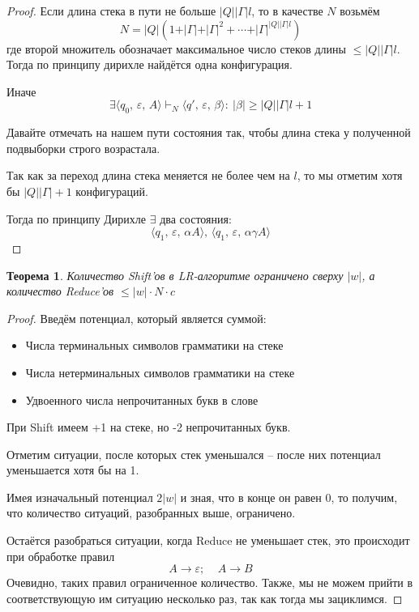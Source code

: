 \documentclass[a4paper,12pt]{article}
\renewcommand{\leq}{\ensuremath{\leqslant}}
\renewcommand{\geq}{\ensuremath{\geqslant}}
\theoremstyle{plain}
\newtheorem{theorem}{Теорема}[subsection]
\theoremstyle{definition}
\theoremstyle{remark}
\begin{document}
\begin{proof}
	Если длина стека в пути не больше $\vert Q\vert\vert\Gamma\vert l$, то в качестве $N$ возьмём
	\[
		N = \vert Q\vert(1 + \vert \Gamma\vert + \vert\Gamma\vert^2 +\cdots + \vert\Gamma\vert^{\vert Q\vert\vert\Gamma\vert l})
	\]
	где второй множитель обозначает максимальное число стеков длины $\leq \vert Q\vert\vert\Gamma\vert l$. Тогда по принципу дирихле найдётся одна конфигурация.

	Иначе
	\[
		\exists \langle q_0,\,\varepsilon,\,A\rangle\vdash_N\langle q',\,\varepsilon,\,\beta\rangle :\: \vert\beta\vert \geq \vert Q\vert\vert\Gamma\vert l + 1
	\]

	Давайте отмечать на нашем пути состояния так, чтобы длина стека у полученной подвыборки строго возрастала.

	Так как за переход длина стека меняется не более чем на $l$, то мы отметим хотя бы $\vert Q\vert\vert\Gamma\vert +1$ конфигураций.

	Тогда по принципу Дирихле $\exists$ два состояния:
	\[
		\langle q_1,\, \varepsilon,\, \alpha A\rangle,\,\langle q_1,\, \varepsilon,\, \alpha\gamma A\rangle
	\]
\end{proof}

\begin{theorem}
	Количество Shift'ов в LR-алгоритме ограничено сверху $\vert w\vert$, а количество Reduce'ов $\leq \vert w\vert\cdot N\cdot c$
\end{theorem}

\begin{proof}
	Введём потенциал, который является суммой:
	\begin{itemize}
		\item Числа терминальных символов грамматики на стеке
		\item Числа нетерминальных символов грамматики на стеке
		\item Удвоенного числа непрочитанных букв в слове
	\end{itemize}
	При Shift имеем +1 на стеке, но -2 непрочитанных букв.

	Отметим ситуации, после которых стек уменьшался -- после них потенциал уменьшается хотя бы на 1.

	Имея изначальный потенциал $2\vert w\vert$ и зная, что в конце он равен $0$, то получим, что количество ситуаций, разобранных выше, ограничено.

	Остаётся разобраться ситуации, когда Reduce не уменьшает стек, это происходит при обработке правил
	\[
		A \to \varepsilon ;\;\;\;\; A \to B
	\]
	Очевидно, таких правил ограниченное количество. Также, мы не можем прийти в соответствующую им ситуацию несколько раз, так как тогда мы зациклимся.
\end{proof}
\end{document}
